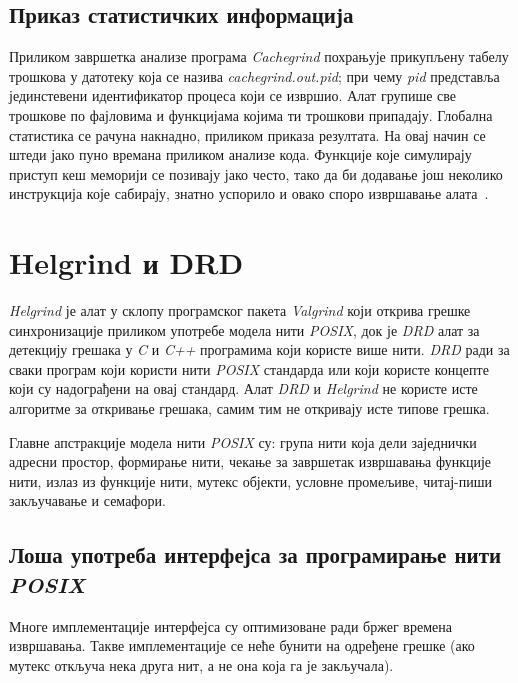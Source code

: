 \documentclass[12pt,oneside]{memoir}
\begin{document}
\subsection{Приказ статистичких информација}

\indent Приликом завршетка анализе програма \textit{Cachegrind} похрањује прикупљену табелу трошкова у датотеку која се назива \textit{cachegrind.out.pid}; при чему \textit{pid} представља јединстевени идентификатор процеса који се извршио. Алат групише све трошкове по фајловима и функцијама којима ти трошкови припадају. Глобална статистика се рачуна накнадно, приликом приказа резултата. На овај начин се штеди јако пуно времана приликом анализе кода. Функције које симулирају приступ кеш меморији се позивају јако често, тако да би додавање још неколико инструкција које сабирају, знатно успорило и овако споро извршавање алата~\cite{cachegrindRef}.

\section{Helgrind и DRD}
\label{section_helgrind}

\indent \textit{Helgrind} је алат у склопу програмског пакета \textit{Valgrind} који открива грешке синхронизације приликом употребе модела нити \textit{POSIX}, док је \textit{DRD} алат за детекцију грешака у \textit{C} и \textit{C++} програмима који користе више нити. \textit{DRD} ради за сваки програм који користи нити \textit{POSIX} стандарда или који користе концепте који су надограђени на овај стандард. Алат \textit{DRD} и \textit{Helgrind} не користе исте алгоритме за откривање грешака, самим тим не откривају исте типове грешка.

\indent Главне апстракције модела нити \textit{POSIX} су: група нити која дели заједнички адресни простор, формирање нити, чекање за завршетак извршавања функције нити, излаз из функције нити, мутекс објекти, условне промељиве, читај-пиши закључавање и семафори.

\subsection{Лоша употреба интерфејса за програмирање нити \textit{POSIX}}

\indent Многе имплементације интерфејса су оптимизоване ради бржег времена извршавања. Такве имплементације се неће бунити на одређене грешке (ако мутекс откључа нека друга нит, а не она која га је закључала).
\end{document}
